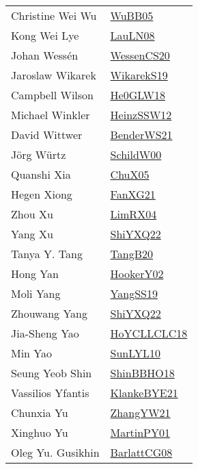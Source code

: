 {\begin{longtable}{p{4cm}p{20cm}}
Christine Wei Wu & \href{papers/WuBB05.pdf}{WuBB05}\cite{WuBB05} \\
Kong Wei Lye & \href{papers/LauLN08.pdf}{LauLN08}\cite{LauLN08} \\
Johan Wess{\'{e}}n & \href{papers/WessenCS20.pdf}{WessenCS20}\cite{WessenCS20} \\
Jaroslaw Wikarek & \href{articles/WikarekS19.pdf}{WikarekS19}\cite{WikarekS19} \\
Campbell Wilson & \href{papers/He0GLW18.pdf}{He0GLW18}\cite{He0GLW18} \\
Michael Winkler & \href{articles/HeinzSSW12.pdf}{HeinzSSW12}\cite{HeinzSSW12} \\
David Wittwer & \href{papers/BenderWS21.pdf}{BenderWS21}\cite{BenderWS21} \\
J{\"{o}}rg W{\"{u}}rtz & \href{articles/SchildW00.pdf}{SchildW00}\cite{SchildW00} \\
Quanshi Xia & \href{papers/ChuX05.pdf}{ChuX05}\cite{ChuX05} \\
Hegen Xiong & \href{articles/FanXG21.pdf}{FanXG21}\cite{FanXG21} \\
Zhou Xu & \href{papers/LimRX04.pdf}{LimRX04}\cite{LimRX04} \\
Yang Xu & \href{articles/ShiYXQ22.pdf}{ShiYXQ22}\cite{ShiYXQ22} \\
Tanya Y. Tang & \href{papers/TangB20.pdf}{TangB20}\cite{TangB20} \\
Hong Yan & \href{papers/HookerY02.pdf}{HookerY02}\cite{HookerY02} \\
Moli Yang & \href{papers/YangSS19.pdf}{YangSS19}\cite{YangSS19} \\
Zhouwang Yang & \href{articles/ShiYXQ22.pdf}{ShiYXQ22}\cite{ShiYXQ22} \\
Jia{-}Sheng Yao & \href{papers/HoYCLLCLC18.pdf}{HoYCLLCLC18}\cite{HoYCLLCLC18} \\
Min Yao & \href{papers/SunLYL10.pdf}{SunLYL10}\cite{SunLYL10} \\
Seung Yeob Shin & \href{articles/ShinBBHO18.pdf}{ShinBBHO18}\cite{ShinBBHO18} \\
Vassilios Yfantis & \href{papers/KlankeBYE21.pdf}{KlankeBYE21}\cite{KlankeBYE21} \\
Chunxia Yu & \href{articles/ZhangYW21.pdf}{ZhangYW21}\cite{ZhangYW21} \\
Xinghuo Yu & \href{articles/MartinPY01.pdf}{MartinPY01}\cite{MartinPY01} \\
Oleg Yu. Gusikhin & \href{papers/BarlattCG08.pdf}{BarlattCG08}\cite{BarlattCG08} \\

\end{longtable}}

